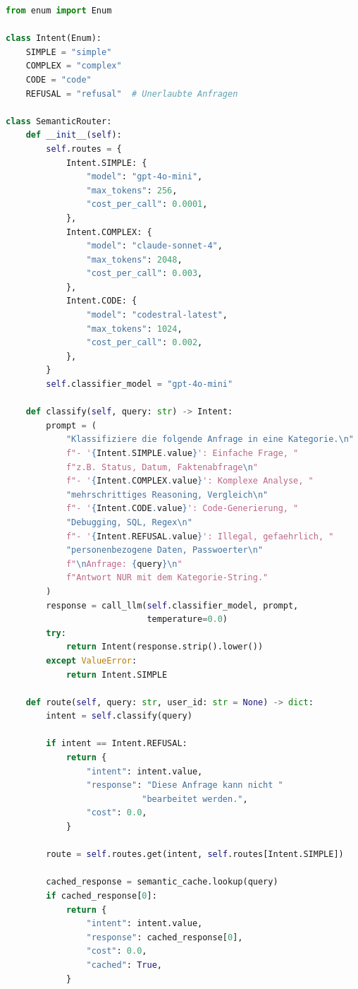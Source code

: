 \begin{lstlisting}[language=Python, caption=Semantic Router mit Intent-Klassifikation]
from enum import Enum

class Intent(Enum):
    SIMPLE = "simple"
    COMPLEX = "complex"
    CODE = "code"
    REFUSAL = "refusal"  # Unerlaubte Anfragen

class SemanticRouter:
    def __init__(self):
        self.routes = {
            Intent.SIMPLE: {
                "model": "gpt-4o-mini",
                "max_tokens": 256,
                "cost_per_call": 0.0001,
            },
            Intent.COMPLEX: {
                "model": "claude-sonnet-4",
                "max_tokens": 2048,
                "cost_per_call": 0.003,
            },
            Intent.CODE: {
                "model": "codestral-latest",
                "max_tokens": 1024,
                "cost_per_call": 0.002,
            },
        }
        self.classifier_model = "gpt-4o-mini"

    def classify(self, query: str) -> Intent:
        prompt = (
            "Klassifiziere die folgende Anfrage in eine Kategorie.\n"
            f"- '{Intent.SIMPLE.value}': Einfache Frage, "
            f"z.B. Status, Datum, Faktenabfrage\n"
            f"- '{Intent.COMPLEX.value}': Komplexe Analyse, "
            "mehrschrittiges Reasoning, Vergleich\n"
            f"- '{Intent.CODE.value}': Code-Generierung, "
            "Debugging, SQL, Regex\n"
            f"- '{Intent.REFUSAL.value}': Illegal, gefaehrlich, "
            "personenbezogene Daten, Passwoerter\n"
            f"\nAnfrage: {query}\n"
            f"Antwort NUR mit dem Kategorie-String."
        )
        response = call_llm(self.classifier_model, prompt,
                            temperature=0.0)
        try:
            return Intent(response.strip().lower())
        except ValueError:
            return Intent.SIMPLE

    def route(self, query: str, user_id: str = None) -> dict:
        intent = self.classify(query)

        if intent == Intent.REFUSAL:
            return {
                "intent": intent.value,
                "response": "Diese Anfrage kann nicht "
                           "bearbeitet werden.",
                "cost": 0.0,
            }

        route = self.routes.get(intent, self.routes[Intent.SIMPLE])

        cached_response = semantic_cache.lookup(query)
        if cached_response[0]:
            return {
                "intent": intent.value,
                "response": cached_response[0],
                "cost": 0.0,
                "cached": True,
            }


\end{lstlisting}
